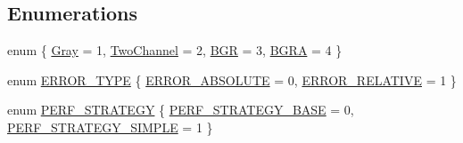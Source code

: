 \subsection*{Enumerations}
\begin{DoxyCompactItemize}
\item 
enum \{ \hyperlink{namespaceperf_a131f9ba0a5af6eeb148ff248f8ad6f92aa696e8d4812896231028f66e8990fdbe}{Gray} = 1, 
\hyperlink{namespaceperf_a131f9ba0a5af6eeb148ff248f8ad6f92a89e2d0908a99ed3831671e639b88b720}{Two\-Channel} = 2, 
\hyperlink{namespaceperf_a131f9ba0a5af6eeb148ff248f8ad6f92aef5b694af6fbc3f9e532e7d96ccdc708}{B\-G\-R} = 3, 
\hyperlink{namespaceperf_a131f9ba0a5af6eeb148ff248f8ad6f92a4d96ca889faa7acd07aeee2520f01485}{B\-G\-R\-A} = 4
 \}
\item 
enum \hyperlink{namespaceperf_afd1ef30dd7868637f168926100ed2ba8}{E\-R\-R\-O\-R\-\_\-\-T\-Y\-P\-E} \{ \hyperlink{namespaceperf_afd1ef30dd7868637f168926100ed2ba8a1f890b566341b120aa632095d9a8259f}{E\-R\-R\-O\-R\-\_\-\-A\-B\-S\-O\-L\-U\-T\-E} = 0, 
\hyperlink{namespaceperf_afd1ef30dd7868637f168926100ed2ba8a9de46d4034be5105a101d8c45da33508}{E\-R\-R\-O\-R\-\_\-\-R\-E\-L\-A\-T\-I\-V\-E} = 1
 \}
\item 
enum \hyperlink{namespaceperf_ae0c38b71955bcc6424ad4de8b5284d57}{P\-E\-R\-F\-\_\-\-S\-T\-R\-A\-T\-E\-G\-Y} \{ \hyperlink{namespaceperf_ae0c38b71955bcc6424ad4de8b5284d57ad61de15dddca486cec1670452cb1da02}{P\-E\-R\-F\-\_\-\-S\-T\-R\-A\-T\-E\-G\-Y\-\_\-\-B\-A\-S\-E} = 0, 
\hyperlink{namespaceperf_ae0c38b71955bcc6424ad4de8b5284d57ad3f0680bd61cfe3c63b46af00269e8ad}{P\-E\-R\-F\-\_\-\-S\-T\-R\-A\-T\-E\-G\-Y\-\_\-\-S\-I\-M\-P\-L\-E} = 1
 \}
\end{DoxyCompactItemize}
